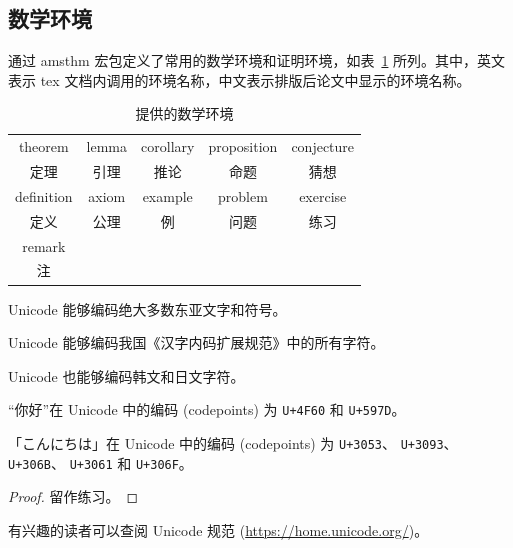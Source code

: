 \documentclass[master]{shtthesis}
\begin{document}
\subsection{数学环境}
\shtthesis 通过 \textsf{amsthm} 宏包定义了常用的数学环境和证明环境，如表~\ref{tab::math_envs} 所列。其中，英文表示 tex 文档内调用的环境名称，中文表示排版后论文中显示的环境名称。

\begin{table}[htb]
\centering
\caption{\shtthesis 提供的数学环境}
\label{tab::math_envs}
\begin{tabular}{*{5}{c}}
  \toprule
  theorem & lemma & corollary & proposition & conjecture \\
  定理    & 引理  & 推论       & 命题        & 猜想       \\
  \midrule
  definition & axiom & example & problem & exercise \\
  定义       & 公理  & 例       & 问题    & 练习     \\
  \midrule
  remark & & & & \\
  注 & & & & \\
  \bottomrule
\end{tabular}
\end{table}

\begin{theorem}
  Unicode 能够编码绝大多数东亚文字和符号。
\end{theorem}

\begin{corollary}
  Unicode 能够编码我国《汉字内码扩展规范》中的所有字符。
\end{corollary}

\begin{corollary}
  Unicode 也能够编码韩文和日文字符。
\end{corollary}

\begin{example}
  “你好”在 Unicode 中的编码 (codepoints) 为 \verb|U+4F60| 和 \verb|U+597D|。
\end{example}

\begin{example}
  「こんにちは」在 Unicode 中的编码 (codepoints) 为 \verb|U+3053|、 \verb|U+3093|、 \verb|U+306B|、 \verb|U+3061| 和 \verb|U+306F|。
\end{example}

\begin{proof}
  留作练习。
\end{proof}

\begin{remark}
  有兴趣的读者可以查阅 Unicode 规范 (\url{https://home.unicode.org/})。
\end{remark}
\end{document}
